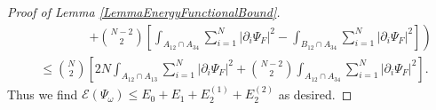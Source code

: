 \documentclass[a4paper,11pt]{article}
\newcommand{\norm}[1]{\left\lVert #1 \right\rVert}
\newcommand{\abs}[1]{\left\lvert #1 \right\rvert}
\newcommand{\R}{\mathbb{R}}
\newcommand{\rr}{\mathcal{R}}
\numberwithin{equation}{section}
\begin{document}
\begin{proof}[Proof of Lemma \ref{LemmaEnergyFunctionalBound}]
\begin{equation}
\begin{aligned}
		&\qquad\qquad\left.+\binom{N-2}{2}\left[\int_{A_{12}\cap A_{34}}\sum_{i=1}^{N}\abs{\partial_i\Psi_F}^2-\int_{B_{12}\cap A_{34}}\sum_{i=1}^{N}\abs{\partial_i\Psi_F}^2\right]\right)\\
		&\leq \binom{N}{2}\left[2N\int_{A_{12}\cap A_{13}}\sum_{i=1}^{N}\abs{\partial_i\Psi_F}^2+\binom{N-2}{2}\int_{A_{12}\cap A_{34}}\sum_{i=1}^{N}\abs{\partial_i\Psi_F}^2\right].
		\end{aligned}
		\end{equation}
		Thus we find $
		\mathcal{E}(\Psi_\omega)\leq E_0+E_1+E_2^{(1)}+E_2^{(2)}$ as desired.
	\end{proof}
\end{document}
